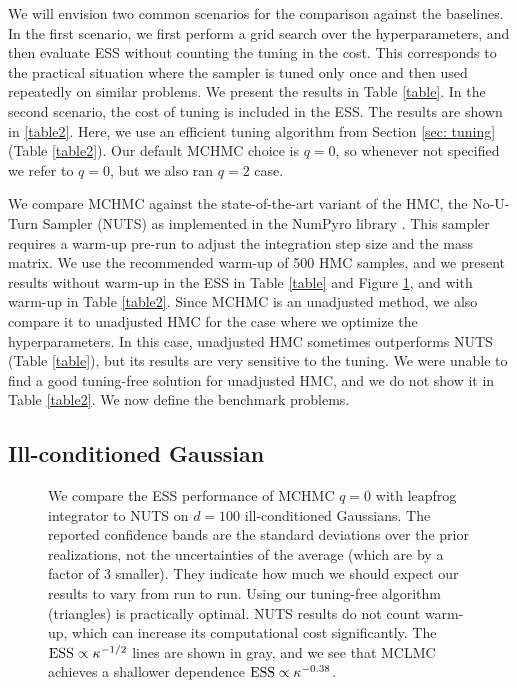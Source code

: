 \documentclass[twoside,11pt]{article}
\begin{document}
We will envision two common scenarios for the comparison against the baselines. In the first scenario, we first perform a grid search over the hyperparameters, and then evaluate ESS without counting the tuning in the cost. This corresponds to the practical situation where the sampler is tuned only once and then used repeatedly on similar problems. We present the results in Table \ref{table}. 
In the second scenario, the cost of tuning is included in the ESS. The results are shown in \ref{table2}. Here, we use an efficient tuning algorithm from Section \ref{sec: tuning} (Table \ref{table2}). 
Our default MCHMC choice is $q=0$, so whenever not specified we refer to $q=0$, but we also ran $q= 2$ case. 

We compare MCHMC against the state-of-the-art variant of the HMC, the No-U-Turn Sampler (NUTS) \citep{NUTS} as implemented in the NumPyro library \citep{NummPyro}. This sampler requires a warm-up pre-run to adjust the integration step size and the mass matrix. We use the recommended warm-up of 500 HMC samples, and we present results without warm-up in the ESS 
 in Table \ref{table} and Figure \ref{fig:kappa}, and with 
 warm-up in Table \ref{table2}. 
Since MCHMC is an unadjusted 
method, we also compare it 
to unadjusted HMC for the case 
where we optimize the hyperparameters. In this case, 
unadjusted HMC sometimes 
outperforms NUTS (Table \ref{table}), 
but its results are very sensitive to 
the tuning. 
We were unable to
find a good tuning-free solution 
for unadjusted HMC, and we do 
not show it in Table \ref{table2}. 
We now define the benchmark problems.



    
\subsection{Ill-conditioned Gaussian}
        
    \begin{figure}
        \caption{We compare the ESS performance of MCHMC $q=0$ with leapfrog integrator to NUTS on $d=100$ ill-conditioned Gaussians. 
        The reported confidence bands are the standard deviations over the prior realizations, not the uncertainties of the average (which are by a factor of 3 smaller). They indicate how much we should expect our results to vary from run to run. 
        Using our tuning-free algorithm (triangles)
        is practically optimal.
        NUTS results do not count warm-up, which can increase its computational cost significantly. The ${\rm ESS} \propto \kappa^{-1/2}$ lines are shown in gray, and we see that MCLMC achieves a shallower dependence ${\rm ESS} \propto \kappa^{-0.38}$.}
        \label{fig:kappa}
    \end{figure}
    
\end{document}
